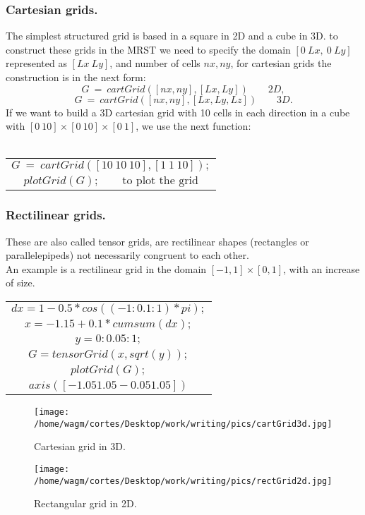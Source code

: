 \documentclass[12pt]{report}
\begin{document}
\subsubsection{Cartesian grids.}
The simplest structured grid is based in a square in 2D and a cube in 3D. to construct these
grids in the MRST we need to specify the domain $[0\: Lx,\: 0\: Ly]$ represented as $[Lx\: Ly]$, and
number of cells $nx, ny$, for cartesian grids the construction is in the next form:\\
$$
G\:=\:cartGrid([nx,ny],[Lx,Ly]) \qquad 2D, $$
$$G\:=\:cartGrid([nx,ny],[Lx,Ly,Lz]) \qquad 3D.
$$
If we want to build a 3D cartesian grid with 10 cells in each direction in a cube with 
$ [0\: 10]\times [0\: 10]\times[0\: 1]$, we use the next function:\\\\
\begin{tabular}{|c|}
\hline
$$
G\:=\:cartGrid([10 \:10\: 10],[1\: 1\: 10]); $$\\
$$plotGrid(G);   \qquad \text{to plot the grid}$$\\
\hline
\end{tabular}


\subsubsection{Rectilinear grids.}
These are also called tensor grids, are rectilinear shapes (rectangles or parallelepipeds) not necessarily 
congruent to each other.\\
An example is a rectilinear grid in the domain $[-1,1]\times[0,1]$, with an increase of size.

\begin{tabular}{|l|}
\hline
 $$dx=1-0.5*cos((-1:0.1:1)*pi);$$ \\
 $$x=-1.15+0.1*cumsum(dx);$$\\
 $$y=0:0.05:1;$$\\
 $$G=tensorGrid(x,sqrt(y));$$\\
 $$plotGrid(G);$$\\
 $$axis([-1.05 1.05 -0.05 1.05])$$\\
\hline
\end{tabular}
\begin{figure}[h!]
\centering
\begin{minipage}{.6\textwidth}
 \centering
\texttt{[image: /home/wagm/cortes/Desktop/work/writing/pics/cartGrid3d.jpg]}
\caption{Cartesian grid in 3D.}
\label{fig:Cartgrid3D}
\end{minipage}%
\begin{minipage}{.5\textwidth}
\centering
\texttt{[image: /home/wagm/cortes/Desktop/work/writing/pics/rectGrid2d.jpg]}
\caption{Rectangular grid in 2D.}
\label{fig:Rectgrid2D}
\end{minipage}
\end{figure}
\end{document}
